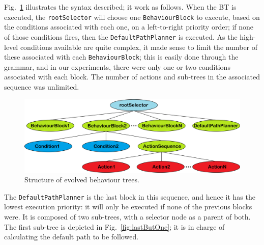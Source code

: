 \documentclass[conference]{IEEEtran}
\begin{document}
Fig.~\ref{fig:defaultTree} illustrates the syntax described; it work as follows.
When the BT is executed, the \texttt{rootSelector} will
choose one \texttt{BehaviourBlock} to execute, based on the conditions
associated with each one, on a left-to-right priority order; if none of those
conditions fires, then the \texttt{DefaultPathPlanner} is executed.  As the
high-level conditions available are quite complex, it made sense to limit the
number of these associated with each \texttt{BehaviourBlock}; this is easily
done through the grammar, and in our experiments, there were only one or two
conditions associated with each block. The number of actions and sub-trees in
the associated sequence was unlimited.

\begin{figure}[ht]
	\begin{center}
	\includegraphics[scale=0.07]{images/defaultTree}
	\caption{Structure of evolved behaviour trees.}
	\label{fig:defaultTree}
	\end{center}
\end{figure}

The \texttt{DefaultPathPlanner} is the last block in this sequence, and hence it
has the lowest execution priority: it will only be executed if none of the
previous blocks were. It is composed of two sub-trees, with a selector
node as a parent of both. 
The first sub-tree is depicted in Fig.~\ref{fig:lastButOne};
it is in charge of calculating the default path to be followed. 

\end{document}
